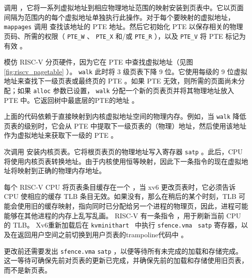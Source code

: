         调用
        ，它将一系列虚拟地址到相应物理地址范围的映射安装到页表中。它以页面间隔为范围内的每个虚拟地址单独执行此操作。对于每个要映射的虚拟地址，
    \lstinline{mappages}    调用
        查找该地址的 PTE 地址。然后它初始化 PTE 以保存相关的物理页码、所需的权限（    \lstinline{PTE_W}    、
    \lstinline{PTE_X}    和/或
    \lstinline{PTE_R}    ），以及
    \lstinline{PTE_V}    将 PTE 标记为有效
        。  

        模仿 RISC-V 分页硬件，因为它在 PTE 中查找虚拟地址（见图    \ref{fig:riscv_pagetable}   ）。
    \lstinline{walk}    此时将 3 级页表下降 9 位。它使用每级的 9 位虚拟地址来查找下一级页表或最终页的 PTE
        。如果 PTE 无效，则所需的页面尚未分配；如果
    \lstinline{alloc}    参数已设置，
    \lstinline{walk}    分配一个新的页表页并将其物理地址放入 PTE 中。它返回树中最底层的PTE的地址
       。  

上面的代码依赖于直接映射到内核虚拟地址空间的物理内存。例如，当    \lstinline{walk}    降低页表的级别时，它会从 PTE        中提取下一级页表的（物理）地址，然后使用该地址作为虚拟地址来获取下一级的 PTE
        。  

       次调用
        安装内核页表。它将根页表页的物理地址写入寄存器
    \texttt{satp}    。此后，CPU 将使用内核页表转换地址。由于内核使用恒等映射，因此下一条指令的现在虚拟地址将映射到正确的物理内存地址。  

每个 RISC-V CPU 将页表条目缓存在一个
        ，当 xv6 更改页表时，它必须告诉 CPU 使相应的缓存 TLB 条目无效。如果没有，那么在稍后的某个时刻，TLB 可能会使用旧的缓存映射，指向同时已分配给另一个进程的物理页，因此，进程可能能够在其他进程的内存上乱写乱画。 RISC-V 有一条指令       ，用于刷新当前 CPU 的 TLB。 Xv6重新加载后在 {    \tt    kvminithart   } 中执行 {    \tt    sfence.vma   } 
    \texttt{satp}   寄存器，以及在返回用户空间之前切换到用户页表的trampoline代码中
        。  

更改前还需要发出    \texttt{sfence.vma}   
    \texttt{satp}    ，以便等待所有未完成的加载和存储完成。这一等待可确保先前对页表的更新已完成，并确保先前的加载和存储使用旧页表，而不是新页表。  

